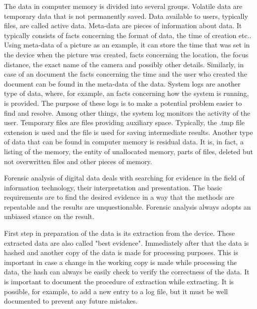 The data in computer memory is divided into several groups. Volatile data are temporary data that is not permanently saved. Data available to users, typically files, are called active data. Meta-data are pieces of information about data. It typically consists of facts concerning the format of data, the time of creation etc.. Using meta-data of a picture as an example, it can store the time that was set in the device when the picture was created, facts concerning the location, the focus distance, the exact name of the camera and possibly other details. Similarly, in case of an document the facts concerning the time and the user who created the document can be found in the meta-data of the data. System logs are another type of data, where, for example, an facts concerning how the system is running, is provided. The purpose of these logs is to make a potential problem easier to find and resolve. Among other things, the system log monitors the activity of the user. Temporary files are files providing auxiliary space. Typically, the .tmp file extension is used and the file is used for saving intermediate results. Another type of data that can be found in computer memory is residual data. It is, in fact, a listing of the memory, the entity of unallocated memory, parts of files, deleted but not overwritten files and other pieces of memory.


Forensic analysis of digital data deals with searching for evidence in the field of information technology, their interpretation and presentation. The basic requirements are to find the desired evidence in a way that the methods are repeatable and the results are unquestionable. Forensic analysis always adopts an unbiased stance on the result.

First step in preparation of the data is its extraction from the device. These extracted data are also called "best evidence". Immediately after that the data is hashed and another copy of the data is made for processing purposes. This is important in case a change in the working copy is made while processing the data, the hash can always be easily check to verify the correctness of the data. It is important to document the procedure of extraction while extracting. It is possible, for example, to add a new entry to a log file, but it must be well documented to prevent any future mistakes.


%
%
%
%
%
%
% 	


